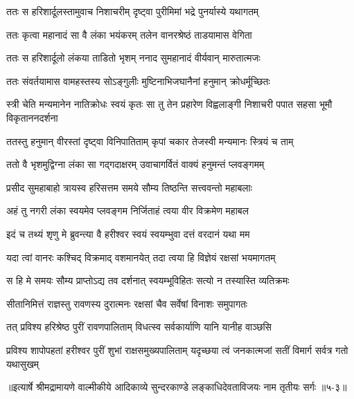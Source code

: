 \twolineshloka
{ततः स हरिशार्दूलस्तामुवाच निशाचरीम्}
{दृष्ट्वा पुरीमिमां भद्रे पुनर्यास्ये यथागतम्} %

\twolineshloka
{ततः कृत्वा महानादं सा वै लंका भयंकरम्}
{तलेन वानरश्रेष्ठं ताडयामास वेगिता} %

\twolineshloka
{ततः स हरिशार्दूलो लंकया ताडितो भृशम्}
{ननाद सुमहानादं वीर्यवान् मारुतात्मजः} %

\twolineshloka
{ततः संवर्तयामास वामहस्तस्य सोऽङ्गुलीः}
{मुष्टिनाभिजघानैनां हनुमान् क्रोधर्मूच्छितः} %

\threelineshloka
{स्त्री चेति मन्यमानेन नातिक्रोधः स्वयं कृतः}
{सा तु तेन प्रहारेण विह्वलाङ्गी निशाचरी}
{पपात सहसा भूमौ विकृताननदर्शना} %

\twolineshloka
{ततस्तु हनुमान् वीरस्तां दृष्ट्वा विनिपातिताम्}
{कृपां चकार तेजस्वी मन्यमानः स्त्रियं च ताम्} %

\twolineshloka
{ततो वै भृशमुद्विग्ना लंका सा गद्गदाक्षरम्}
{उवाचागर्वितं वाक्यं हनुमन्तं प्लवङ्गमम्} %

\twolineshloka
{प्रसीद सुमहाबाहो त्रायस्व हरिसत्तम}
{समये सौम्य तिष्ठन्ति सत्त्ववन्तो महाबलाः} %

\twolineshloka
{अहं तु नगरी लंका स्वयमेव प्लवङ्गम}
{निर्जिताहं त्वया वीर विक्रमेण महाबल} %

\twolineshloka
{इदं च तथ्यं शृणु मे ब्रुवन्त्या वै हरीश्वर}
{स्वयं स्वयम्भुवा दत्तं वरदानं यथा मम} %

\twolineshloka
{यदा त्वां वानरः कश्चिद् विक्रमाद् वशमानयेत्}
{तदा त्वया हि विज्ञेयं रक्षसां भयमागतम्} %

\twolineshloka
{स हि मे समयः सौम्य प्राप्तोऽद्य तव दर्शनात्}
{स्वयम्भूविहितः सत्यो न तस्यास्ति व्यतिक्रमः} %

\twolineshloka
{सीतानिमित्तं राज्ञस्तु रावणस्य दुरात्मनः}
{रक्षसां चैव सर्वेषां विनाशः समुपागतः} %

\twolineshloka
{तत् प्रविश्य हरिश्रेष्ठ पुरीं रावणपालिताम्}
{विधत्स्व सर्वकार्याणि यानि यानीह वाञ्छसि} %

\twolineshloka
{प्रविश्य शापोपहतां हरीश्वर पुरीं शुभां राक्षसमुख्यपालिताम्}
{यदृच्छया त्वं जनकात्मजां सतीं विमार्ग सर्वत्र गतो यथासुखम्} %


॥इत्यार्षे श्रीमद्रामायणे वाल्मीकीये आदिकाव्ये सुन्दरकाण्डे लङ्काधिदेवताविजयः नाम तृतीयः सर्गः ॥५-३॥
